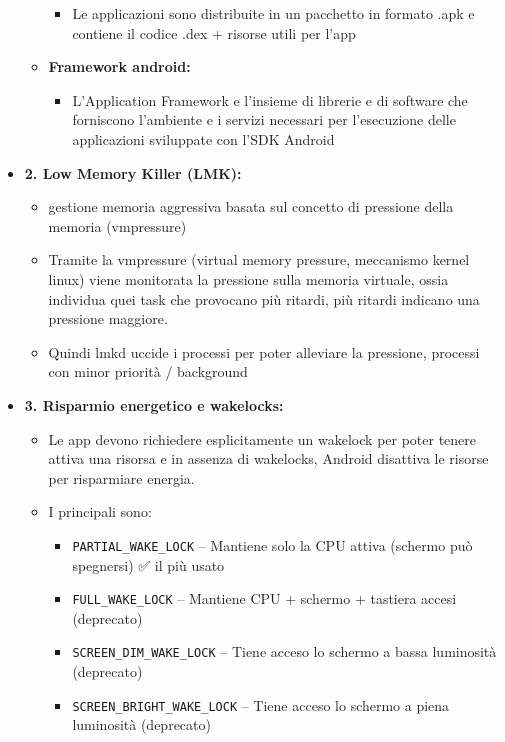 \documentclass{report}
\begin{document}
\begin{itemize}
\begin{itemize}
\begin{itemize}
        \item Le applicazioni sono distribuite in un pacchetto in formato .apk e contiene il codice .dex + risorse utili per l’app
    \end{itemize}
    \item \textbf{Framework android:}
    \begin{itemize}
        \item L’Application Framework e l’insieme di librerie e di software che forniscono l’ambiente e i servizi necessari per l’esecuzione delle applicazioni sviluppate con l’SDK Android
    \end{itemize}
\end{itemize}

\item \textbf{2. Low Memory Killer (LMK):}
\begin{itemize}
    \item gestione memoria aggressiva basata sul concetto di pressione della memoria (vmpressure)
    \item Tramite la vmpressure (virtual memory pressure, meccanismo kernel linux) viene monitorata la pressione sulla memoria virtuale, ossia individua quei task che provocano pi\`u ritardi, pi\`u ritardi indicano una pressione maggiore.
    \item Quindi lmkd uccide i processi per poter alleviare la pressione, processi con minor priorit\`a / background
\end{itemize}

\item \textbf{3. Risparmio energetico e wakelocks:}
\begin{itemize}
    \item Le app devono richiedere esplicitamente un wakelock per poter tenere attiva una risorsa e in assenza di wakelocks, Android disattiva le risorse per risparmiare energia.
    \item I principali sono:
    \begin{itemize}
        \item \texttt{PARTIAL\_WAKE\_LOCK} – Mantiene solo la CPU attiva (schermo pu\`o spegnersi) ✅ il pi\`u usato
        \item \texttt{FULL\_WAKE\_LOCK} – Mantiene CPU + schermo + tastiera accesi (deprecato)
        \item \texttt{SCREEN\_DIM\_WAKE\_LOCK} – Tiene acceso lo schermo a bassa luminosit\`a (deprecato)
        \item \texttt{SCREEN\_BRIGHT\_WAKE\_LOCK} – Tiene acceso lo schermo a piena luminosit\`a (deprecato)
    \end{itemize}
\end{itemize}


\end{itemize}
\end{document}
